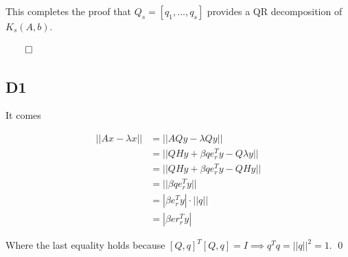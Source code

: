 \documentclass[a4paper,10pt]{article}
\begin{document}
This completes the proof that \( Q_s = [q_1, ..., q_s] \) provides a QR decomposition of \( K_s(A, b) \).

\begin{flushright}
    $\qed$
\end{flushright}


\subsection*{D1}

It comes

\begin{align*}
|| Ax - \lambda x || &= || A Q y - \lambda Q y || \\
&= || Q H y + \beta q e_r^T y -Q \lambda y || \\
&= || Q H y + \beta q e_r^T y -Q H y || \\
&= || \beta q e_r^T y || \\
&= | \beta e_r^T y | \cdot ||q|| \\
&= | \beta er_r^T y |
\end{align*}

Where the last equality holds because $[ Q,q]^T [Q, q] = I \implies q^T q = ||q||^2 = 1$. \qed
\end{document}
